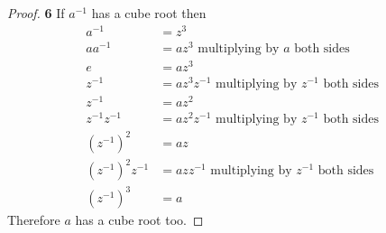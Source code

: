 \documentclass[11pt]{article}
\begin{document}
		\begin{proof}{\textbf{6}}
			If $a^{-1}$ has a cube root then
			\begin{align*}
				a^{-1} & = z^3 \\
				aa^{-1} & = az^{3} \text{ multiplying by }a \text{ both sides }\\
				e & = az^{3} \\ 
				z^{-1} & = a z^{3}z^{-1} \text{ multiplying by } z^{-1} \text{ both sides }\\
				z^{-1} & = az^2 \\
				z^{-1}z^{-1} & = az^2z^{-1} \text{ multiplying by } z^{-1} \text{ both sides }\\
				(z^{-1})^{2} & = az \\
				(z^{-1})^{2}z^{-1} & = azz^{-1} \text{ multiplying by } z^{-1} \text{ both sides }\\
				(z^{-1})^{3} & = a
			\end{align*}
			Therefore $a$ has a cube root too.
		\end{proof}
\end{document}
